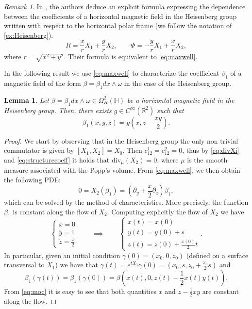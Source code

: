 \documentclass{amsart}
\theoremstyle{plain}
\newtheorem{lemma}[theorem]{Lemma}
\theoremstyle{definition}
\theoremstyle{remark}
\newtheorem{remark}[thm]{Remark}
\newcommand{\R}{\mathbb{R}}
\newcommand{\p}{\partial}												%
\newcommand{\B}{\beta}
\begin{document}
\begin{remark} 
In \cite[Proposition 4.2]{CFKP23}, the authors deduce an explicit formula expressing the dependence between the coefficients of a horizontal magnetic field in the Heisenberg group written with respect to the horizontal polar frame (we follow the notation of \cref{ex:Heisenberg}).
\begin{equation}
	R=\frac{x}{r}X_1+\frac{y}{r}X_2,
	\qquad
	\Phi=-\frac{y}{r}X_1+\frac{x}{r}X_2,
\end{equation}
where $r=\sqrt{x^2+y^2}$. 
Their formula is equivalent to \eqref{eq:maxwell}.
\end{remark}

In the following result we use \eqref{eq:maxwell} to characterize the coefficient $\B_1$ of a magnetic field of the form $\B=\B_1dx\wedge\omega$ in the case of the Heisenberg group.

\begin{lemma}
Let $\B=\B_1dx\wedge\omega\in \Omega^2_H(\mathbb{H})$ be a horizontal magnetic field in the Heisenberg group. 
Then, there exists $g\in C^\infty\left(\R^2\right)$ such that
\begin{equation}
\B_1(x,y,z)=g\left(x, z-\frac{xy}{2}\right).
\end{equation} 
\end{lemma}

\begin{proof}
We start by observing that in the Heisenberg group the only non trivial commutator is given by $[X_{1},X_{2}]=X_{0}$. Then $c_{12}^{1}=c_{12}^{2}=0$, thus by \eqref{eq:divXi} and \eqref{eq:structurecoeff} it holds that $\mathrm{div}_\mu(X_2)=0$, where $\mu$ is the smooth measure associated with the Popp's volume. From \eqref{eq:maxwell}, we then obtain the following PDE:
\begin{equation}
\label{eq:PDE}
0=X_2(\B_1)=\left(\p_y+\frac{x}{2}\p_z\right)\B_1,
\end{equation} 
which can be solved by the method of characteristics.
More precisely, the function $\beta_{1}$ is constant along the flow of $X_{2}$. 
Computing explicitly the flow of $X_{2}$ we have
\begin{equation}\label{eq:moc}
\begin{cases}
\dot{x}=0\\
\dot{y}=1\\
\dot{z}=\frac{x}{2}
\end{cases}
\qquad \implies \qquad
\begin{cases}
x(t)=x(0)\\
y(t)=y(0)+s\\
z(t)=z(0)+\frac{x(0)}{2}t
\end{cases}.
\end{equation}
In particular, given an initial condition $\gamma(0)=(x_0,0,z_0)$ (defined on a surface transversal to $X_{1}$) we have that $\gamma(t)=e^{tX_{1}}\gamma(0)=(x_0,s,z_0+\frac{x_0}{2}s)$ and $$\B_1(\gamma(t))=\B_1(\gamma(0))=\B(x(t),0,z(t)-\frac{1}{2}x(t)y(t)).$$ From \eqref{eq:moc} it 
 is easy to see that both quantities $x$ and $z-\frac{1}{2}xy$ are constant along the flow.
\end{proof}
\end{document}
